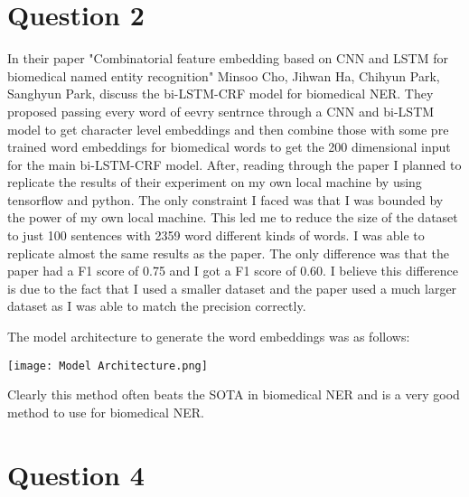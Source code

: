\documentclass{article}
\begin{document}
\section{Question 2}

In their paper "Combinatorial feature embedding based on CNN and LSTM for biomedical named entity recognition" Minsoo Cho, Jihwan Ha, Chihyun Park, Sanghyun Park, discuss the bi-LSTM-CRF model for biomedical NER. They proposed passing every word of eevry sentrnce through a CNN and bi-LSTM model to get character level embeddings and then combine those with some pre trained word embeddings for biomedical words to get the 200 dimensional input for the main bi-LSTM-CRF model. After, reading through the paper I planned to replicate the results of their experiment on my own local machine by using tensorflow and python. The only constraint I faced was that I was bounded by the power of my own local machine. This led me to reduce the size of the dataset to just 100 sentences with 2359 word different kinds of words. I was able to replicate almost the same results as the paper. The only difference was that the paper had a F1 score of 0.75 and I got a F1 score of 0.60. I believe this difference is due to the fact that I used a smaller dataset and the paper used a much larger dataset as I was able to match the precision correctly.

The model architecture to generate the word embeddings was as follows:

\texttt{[image: Model Architecture.png]}

Clearly this method often beats the SOTA in biomedical NER and is a very good method to use for biomedical NER.

\section{Question 4}
\end{document}
